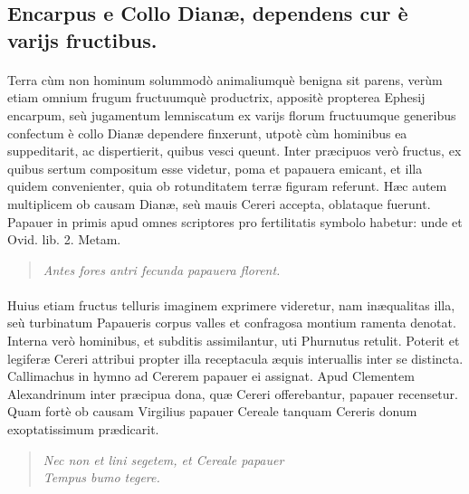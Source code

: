 \documentclass[a4paper, 11pt, oneside, polutonikogreek, latin]{article}
\begin{document}
\subsection{Encarpus e Collo Dianæ, dependens cur è varijs fructibus.}
\paragraph{}
Terra cùm non hominum solummodò animaliumquè benigna sit parens, verùm etiam omnium frugum fructuumquè productrix, appositè propterea Ephesij encarpum, seù jugamentum lemniscatum ex varijs florum fructuumque generibus confectum è collo Dianæ dependere finxerunt, utpotè cùm hominibus ea suppeditarit, ac dispertierit, quibus vesci queunt. Inter præcipuos verò fructus, ex quibus sertum compositum esse videtur, poma et papauera emicant, et illa quidem convenienter, quia ob rotunditatem terræ figuram referunt. Hæc autem multiplicem ob causam Dianæ, seù mauis Cereri accepta, oblataque fuerunt. Papauer in primis apud omnes scriptores pro fertilitatis symbolo habetur: unde et Ovid. lib. 2. Metam.
\begin{quote}
\emph{Antes fores antri fecunda papauera florent.}
\end{quote}
\vspace*{-4mm}
\paragraph{}
Huius etiam fructus telluris imaginem exprimere videretur, nam inæqualitas illa, seù turbinatum Papaueris corpus valles et confragosa montium ramenta denotat. Interna verò hominibus, et subditis assimilantur, uti Phurnutus retulit. Poterit et legiferæ Cereri attribui propter illa receptacula æquis interuallis inter se distincta. Callimachus in hymno ad Cererem papauer ei assignat. Apud Clementem Alexandrinum inter præcipua dona, quæ Cereri offerebantur, papauer recensetur. Quam fortè ob causam Virgilius papauer Cereale tanquam Cereris donum exoptatissimum prædicarit.
\begin{quote}
\emph{Nec non et lini segetem, et Cereale papauer}\\
\emph{Tempus bumo tegere.}\\
\end{quote}
\vspace*{-8mm}
\end{document}
